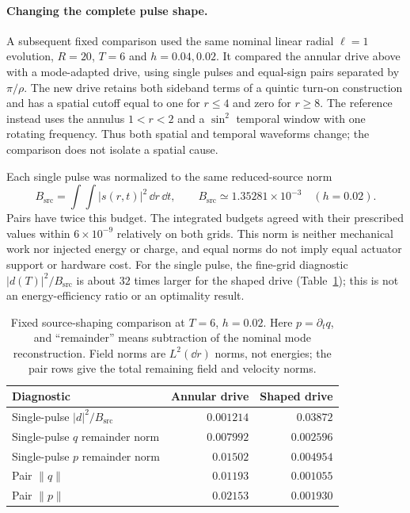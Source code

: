 \paragraph{Changing the complete pulse shape.}
A subsequent fixed comparison used the same nominal linear radial
$\ell=1$ evolution, $R=20$, $T=6$ and $h=0.04,0.02$.
It compared the annular drive above with a mode-adapted drive, using
single pulses and equal-sign pairs separated by $\pi/\rho$.
The new drive retains both sideband terms of a quintic turn-on construction
and has a spatial cutoff equal to one for $r\leq4$ and zero for $r\geq8$.
The reference instead uses the annulus $1<r<2$ and a $\sin^2$ temporal
window with one rotating frequency. Thus both spatial and temporal
waveforms change; the comparison does not isolate a spatial cause.

Each single pulse was normalized to the same reduced-source norm
\begin{equation}
 B_{\mathrm{src}}=\int\!\int |s(r,t)|^2\,\dd r\,\dd t,
 \qquad B_{\mathrm{src}}\simeq1.35281\times10^{-3}
 \quad(h=0.02).
\end{equation}
Pairs have twice this budget. The integrated budgets agreed with their
prescribed values within $6\times10^{-9}$ relatively on both grids.
This norm is neither mechanical work nor injected energy or charge,
and equal norms do not imply equal actuator support or hardware cost.
For the single pulse, the fine-grid diagnostic $|d(T)|^2/B_{\mathrm{src}}$
is about $32$ times larger for the shaped drive
(Table~\ref{tab:source-shaping}); this is not an energy-efficiency ratio
or an optimality result.

\begin{table}[htbp]\centering\small
\caption{Fixed source-shaping comparison at $T=6$, $h=0.02$.
Here $p=\partial_tq$, and ``remainder'' means subtraction of the nominal
mode reconstruction. Field norms are $L^2(\dd r)$ norms, not energies;
the pair rows give the total remaining field and velocity norms.}
\label{tab:source-shaping}
\begin{tabular}{lrr}\toprule
Diagnostic&Annular drive&Shaped drive\\\midrule
Single-pulse $|d|^2/B_{\mathrm{src}}$&$0.001214$&$0.03872$\\
Single-pulse $q$ remainder norm&$0.007992$&$0.002596$\\
Single-pulse $p$ remainder norm&$0.01502$&$0.004954$\\
Pair $\|q\|$&$0.01193$&$0.001055$\\
Pair $\|p\|$&$0.02153$&$0.001930$\\\bottomrule
\end{tabular}
\end{table}

